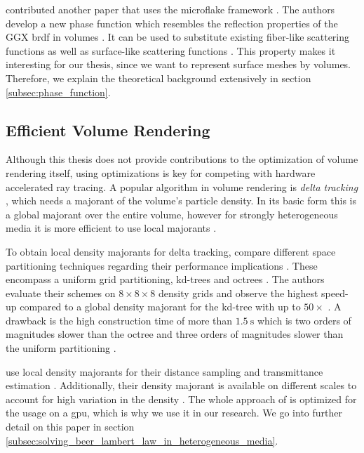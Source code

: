 \citeauthor{sggx} contributed another paper that uses the microflake framework \cite{sggx}.
The authors develop a new phase function which resembles the reflection properties of the GGX \ac{brdf} in volumes \cite{sggx}.
It can be used to substitute existing fiber-like scattering functions as well as surface-like scattering functions \cite{sggx}.
This property makes it interesting for our thesis, since we want to represent surface meshes by volumes.
Therefore, we explain the theoretical background extensively in section \ref{subsec:phase_function}.

\subsection{Efficient Volume Rendering}
Although this thesis does not provide contributions to the optimization of volume rendering itself, using optimizations is key for competing with hardware accelerated ray tracing.
A popular algorithm in volume rendering is \textit{delta tracking} \cite{woodcock}, which needs a majorant of the volume's particle density.
In its basic form this is a global majorant over the entire volume, however for strongly heterogeneous media it is more efficient to use local majorants \cite{novak_overview}.

To obtain local density majorants for delta tracking, \citeauthor{yue_space_partitioning} compare different space partitioning techniques regarding their performance implications \cite{yue_space_partitioning}.
These encompass a uniform grid partitioning, kd-trees and octrees \cite{yue_space_partitioning}.
The authors evaluate their schemes on $8 \times 8 \times 8$ density grids and observe the highest speed-up compared to a global density majorant for the kd-tree with up to ${50\times}$ \cite{yue_space_partitioning}.
A drawback is the high construction time of more than $\SI{1.5}{\s}$ which is two orders of magnitudes slower than the octree and three orders of magnitudes slower than the uniform partitioning \cite{yue_space_partitioning}.

\citeauthor{brick_grid} use local density majorants for their distance sampling and transmittance estimation \cite{brick_grid}.
Additionally, their density majorant is available on different scales to account for high variation in the density \cite{brick_grid}.
The whole approach of \citeauthor{brick_grid} is optimized for the usage on a \ac{gpu}, which is why we use it in our research.
We go into further detail on this paper in section \ref{subsec:solving_beer_lambert_law_in_heterogeneous_media}.

